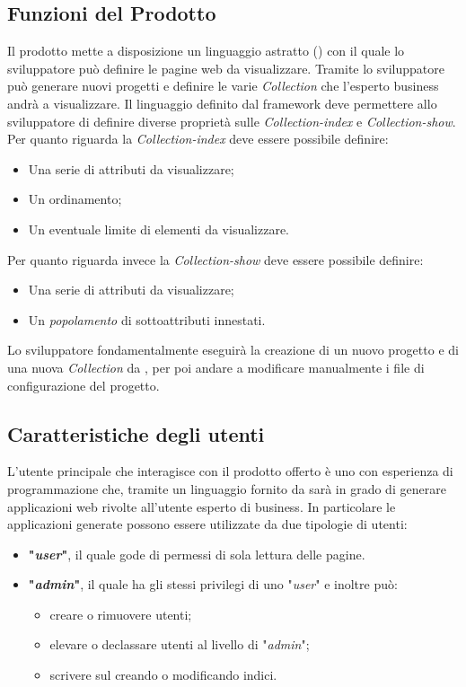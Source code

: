 	\subsection{Funzioni del Prodotto}
	Il prodotto \ProjectName{} mette a disposizione un linguaggio astratto () con il quale lo sviluppatore può definire le pagine web da visualizzare. Tramite \ProjectName{} lo sviluppatore può generare nuovi progetti e definire le varie \textit{Collection} che l'esperto business andrà a visualizzare. Il linguaggio definito dal framework deve permettere allo sviluppatore di definire diverse proprietà sulle \textit{Collection-index} e \textit{Collection-show}. Per quanto riguarda la \textit{Collection-index} deve essere possibile definire:
	\begin{itemize}
		\item Una serie di attributi da visualizzare;
		\item Un ordinamento;
		\item Un eventuale limite di elementi da visualizzare.
	\end{itemize}
	Per quanto riguarda invece la \textit{Collection-show} deve essere possibile definire:
	\begin{itemize}	
		\item Una serie di attributi da visualizzare;
		\item Un \textit{popolamento} di sottoattributi innestati.	
	\end{itemize}
	
Lo sviluppatore fondamentalmente eseguirà la creazione di un nuovo progetto e di una nuova \textit{Collection} da , per poi andare a modificare manualmente i file di configurazione del progetto.
		
	\subsection{Caratteristiche degli utenti}
	L'utente principale che interagisce con il prodotto offerto è uno  con esperienza di programmazione che, tramite un linguaggio  fornito da \ProjectName{} sarà in grado di generare applicazioni web rivolte all'utente esperto di business. In particolare le applicazioni generate possono essere utilizzate da due tipologie di utenti:
	\begin{itemize}
		\item \textbf{"\textit{user}"}, il quale gode di permessi di sola lettura delle pagine. 
		\item \textbf{"\textit{admin}"}, il quale ha gli stessi privilegi di uno "\textit{user}" e inoltre può:
		\begin{itemize}
			\item creare o rimuovere utenti;
			\item elevare o declassare utenti al livello di "\textit{admin}";
			\item scrivere sul  creando o modificando indici.
		\end{itemize}		 	
	\end{itemize}
	
